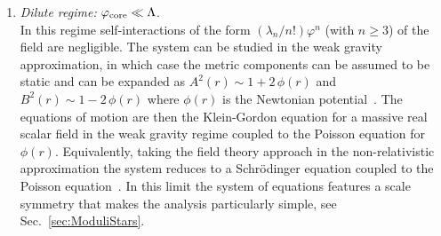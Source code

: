 \documentclass[11pt,a4paper]{article}
\begin{document}
\begin{enumerate}
\item{} {\it Dilute regime:} $\varphi_{\rm core} \ll \Lambda$.\\
In this regime self-interactions of the form $\left(\lambda_n/n!\right) \varphi^n$ (with $n \geq 3$) of the field are negligible. The system can be studied in the weak gravity approximation, in which case the metric components can be assumed to be static and can be expanded as $A^2(r) \sim 1+2\,\phi(r)$ and $B^{2}(r) \sim 1-2\,\phi(r)$ where $\phi(r)$ is the Newtonian potential~\cite{UrenaLopez:2002gx, Visinelli:2017ooc}. The equations of motion are then the Klein-Gordon equation for a massive real scalar field in the weak gravity regime coupled to the Poisson equation for $\phi(r)$. Equivalently, taking the field theory approach in the non-relativistic approximation the system reduces to a Schr\"odinger equation coupled to the Poisson equation~\cite{Guzman:2004wj, Guth:2014hsa}. In this limit the system of equations features a scale symmetry that makes the analysis particularly simple, see Sec.~\ref{sec:ModuliStars}.
 

\end{enumerate}
\end{document}

